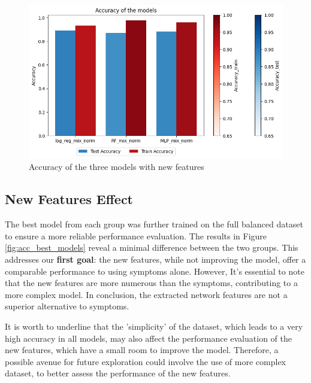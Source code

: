 \begin{figure}[H]
	\centering
	\includegraphics[width=\columnwidth]{images/acc_new_features.png}
	\caption{Accuracy of the three models with new features}
	\label{fig:acc_new_features}
\end{figure}




\subsection{New Features Effect}

\noindent
The best model from each group was further trained on the full balanced dataset to ensure a more reliable 
performance evaluation. The results in Figure \ref{fig:acc_best_models} reveal a minimal difference between 
the two groups. This addresses our \textbf{first goal}: the new features, while not improving the model, 
offer a comparable performance to using symptoms alone. However, It's essential to note that the new features are 
more numerous than the symptoms, contributing to a more complex model. In conclusion, the extracted network 
features are not a superior alternative to symptoms. 

It is worth to underline that the 'simplicity' of the dataset, which leads to a very high accuracy in all models, may also affect the performance
evaluation of the new features, which have a small room to improve the model. Therefore, a possible avenue
for future exploration could involve the use of more complex dataset, to better assess the performance of the
new features.

